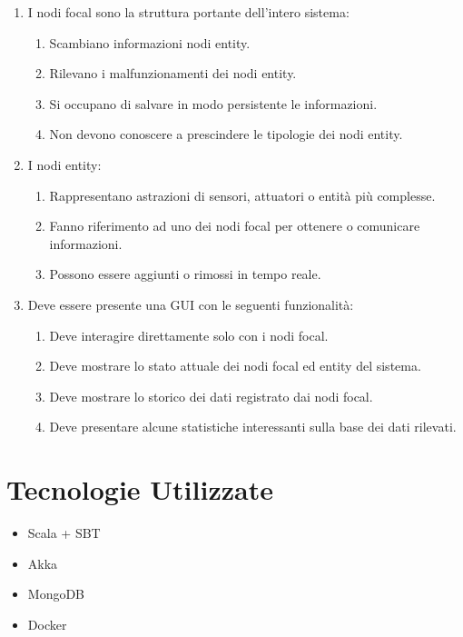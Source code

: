 \documentclass[12pt,a4paper,openright,twoside]{book}
\begin{document}
\begin{enumerate}
    \item I nodi focal sono la struttura portante dell'intero sistema:
    \begin{enumerate}
        \item Scambiano informazioni nodi entity.
        \item Rilevano i malfunzionamenti dei nodi entity.
        \item Si occupano di salvare in modo persistente le informazioni.
        \item Non devono conoscere a prescindere le tipologie dei nodi entity.
    \end{enumerate}
    \item I nodi entity:
    \begin{enumerate}
        \item Rappresentano astrazioni di sensori, attuatori o entità più complesse.
        \item Fanno riferimento ad uno dei nodi focal per ottenere o comunicare informazioni.
        \item Possono essere aggiunti o rimossi in tempo reale.
    \end{enumerate}
    \item Deve essere presente una GUI con le seguenti funzionalità:
    \begin{enumerate}
        \item Deve interagire direttamente solo con i nodi focal.
        \item Deve mostrare lo stato attuale dei nodi focal ed entity del sistema.
        \item Deve mostrare lo storico dei dati registrato dai nodi focal.
        \item Deve presentare alcune statistiche interessanti sulla base dei dati rilevati.
    \end{enumerate}
\end{enumerate}

\section{Tecnologie Utilizzate}

\begin{itemize}
    \item Scala + SBT
    \item Akka
    \item MongoDB
    \item Docker
\end{itemize}
\end{document}
